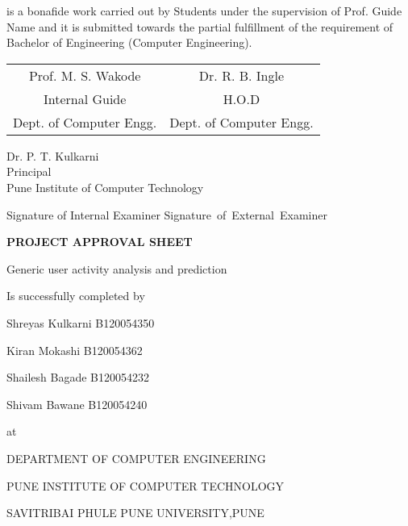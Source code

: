 \documentclass[oneside,a4paper,12pt]{book}
\begin{document}
is a bonafide work carried out by Students under the supervision of Prof. Guide Name and it
is submitted towards the partial fulfillment of the requirement of Bachelor of Engineering (Computer Engineering).\\
\vskip 1cm
\bgroup
\def\arraystretch{0.7}
\begin{tabular}{c c }
Prof. M. S. Wakode &  \hspace{50 mm} Dr. R. B. Ingle \\								
Internal Guide   &  \hspace{50 mm} H.O.D \\
Dept. of Computer Engg.  &	\hspace{50 mm}Dept. of Computer Engg.  \\
\end{tabular}
\begin{center}
{
\vskip 1cm
Dr. P. T. Kulkarni\\
Principal\\
Pune Institute of Computer Technology  
}
\end{center}
\vskip 1cm
Signature of Internal Examiner \hspace{40 mm}\mbox{Signature of External Examiner}
\newpage
\begin{center}
\textbf{PROJECT APPROVAL SHEET}
\end{center}
\begin{center}
 Generic user activity analysis and prediction
 \end{center}
\begin{center}

\end{center}
\begin{center}
Is successfully completed by 
\end{center}
\centerline{Shreyas Kulkarni \hspace{27 mm} B120054350 }
\centerline{Kiran Mokashi  \hspace{27 mm}   B120054362 } 
\centerline{Shailesh Bagade \hspace{25 mm} B120054232  } 
\centerline{Shivam Bawane \hspace{25 mm} B120054240 }

\begin{center}
 at
 \end{center} 
 \begin{center}
 DEPARTMENT OF COMPUTER ENGINEERING
 \end{center}
 \begin{center}
 PUNE INSTITUTE OF COMPUTER TECHNOLOGY
 \end{center}
 \begin{center}
 SAVITRIBAI PHULE PUNE UNIVERSITY,PUNE
 \end{center}
 
\end{document}
